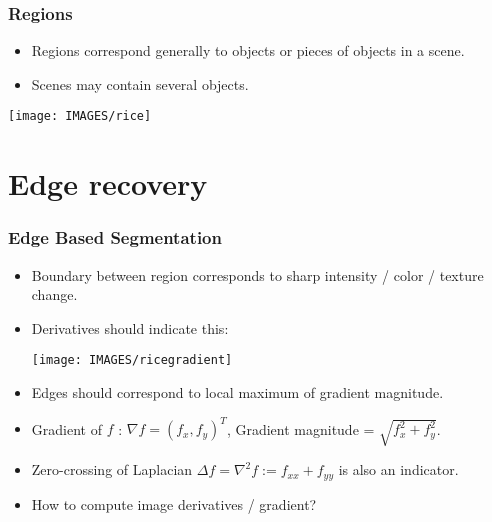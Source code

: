 \documentclass[9pt]{beamer}
\begin{document}


\begin{frame}
  \frametitle{Regions}
  \begin{itemize}
  \item Regions correspond generally to objects or pieces of objects in a scene. 
  \item Scenes may contain several objects.
  \end{itemize}
  \begin{center}
    \texttt{[image: IMAGES/rice]}
 \end{center}
\end{frame}



\section{Edge recovery}


\begin{frame}
  \frametitle{Edge Based Segmentation}
  \begin{itemize}
  \item Boundary between region corresponds to sharp intensity / color / texture change.
  \item Derivatives should indicate this:
    \begin{center}
      \texttt{[image: IMAGES/ricegradient]}
    \end{center}
  \item Edges should correspond to local maximum of gradient magnitude.
  \item Gradient of $f$ : $\nabla f = (f_x,f_y)^T$, Gradient magnitude = $\sqrt{f_x^2 + f_y^2}$.
  \item Zero-crossing of Laplacian $\Delta f = \nabla^2 f := f_{xx} + f_{yy}$ is also an indicator.
  \item How to compute image derivatives / gradient?
  \end{itemize} 
  
\end{frame}
\end{document}
